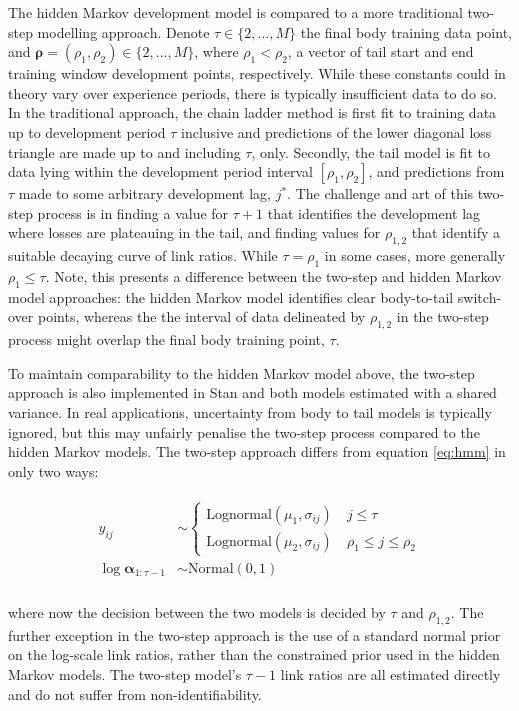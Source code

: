 The hidden Markov development model is compared to
a more traditional two-step modelling approach.
Denote $\tau \in \{2, ..., M\}$ the final body
training data point, and
$\bm{\rho} = (\rho_{1}, \rho_{2}) \in \{2, ..., M\}$,
where $\rho_{1} < \rho_{2}$,
a vector of tail start and end training window
development points, respectively.
While these constants could in theory vary over
experience periods, there is typically insufficient
data to do so.
In the traditional approach, the chain ladder
method is first fit to training data up
to development period $\tau$ inclusive and
predictions of the lower diagonal loss
triangle are made up to and including $\tau$, only.
Secondly, the tail model is fit to data
lying within the development period
interval $[\rho_{1}, \rho_{2}]$,
and predictions from $\tau$ made to 
some arbitrary development lag, $j^{*}$.
The challenge and art of this two-step process
is in finding a value for $\tau + 1$ that
identifies the development lag where
losses are plateauing in the tail,
and finding values for $\rho_{1,2}$ that
identify a suitable decaying curve of link ratios.
While $\tau = \rho_{1}$ in some cases,
more generally $\rho_{1} \leq \tau$.
Note, this presents a difference between
the two-step and hidden Markov model approaches:
the hidden Markov model identifies clear
body-to-tail switch-over points,
whereas the the interval of data
delineated by
$\rho_{1,2}$ in the two-step process
might overlap
the final body training point, $\tau$.

To maintain comparability to the hidden
Markov model above, the two-step
approach is also implemented in Stan
and both models estimated
with a shared variance. In real
applications, uncertainty 
from body to tail models is typically
ignored, but this may
unfairly penalise the two-step process
compared to the hidden Markov models. The
two-step approach differs from
equation \ref{eq:hmm} in only two
ways:

\begin{align}
\begin{split}
	y_{ij} &\sim 
	\begin{cases}
		\mathrm{Lognormal}(\mu_{1}, \sigma_{ij}) \quad j \leq \tau\\
		\mathrm{Lognormal}(\mu_{2}, \sigma_{ij}) \quad \rho_{1} \leq j \leq \rho_{2}
	\end{cases}\\
	\log \bm{\alpha}_{1:\tau - 1} &\sim \mathrm{Normal}(0, 1)\\
\end{split}
\end{align}

where now the decision between the two
models is decided by $\tau$ and $\rho_{1,2}$.
The further exception in the two-step approach
is the use of a standard normal prior
on the log-scale link ratios, rather than the
constrained prior used in the hidden Markov models.
The two-step model's $\tau - 1$ link
ratios are all estimated directly and do not suffer
from non-identifiability.
